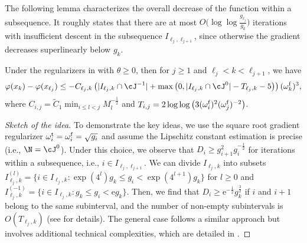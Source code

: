 The following lemma characterizes the overall decrease of the function within a subsequence.
It roughly states that there are at most $O\big (\log\log \frac{g_{\ell_j}}{g_k}\big )$ iterations with insufficient descent in the subsequence $I_{\ell_j,\ell_{j+1}}$,
since otherwise the gradient decreases superlinearly below $g_k$.

\begin{lemma}
    \label{lem:main/iteration-in-a-subsequence}
    Under the regularizers in  with $\theta \geq 0$, 
    then for $j \geq 1$ and $\ell_j  < k < \ell_{j+1}$, we have
    \begin{align}
        \varphi(x_{k})
        - \varphi(x_{\ell_{j}})
        \leq
         - C_{\ell_j,k}
        \left ( 
            |I_{\ell_j,k} \cap \cJ^{-1} |
            + 
            \max\left ( 0, | I_{\ell_j,k} \cap \cJ^0 | - T_{\ell_j,k} - 5 \right ) 
        \right ) (\omega_k^{\supfallback})^3
         ,
         \label{eqn:main/inexact-mixed-newton-inner-bound-theta0}
    \end{align}
    where $C_{i,j} = \tilde C_1 %
    \min_{i \leq l < j} M_l^{-\frac{1}{2}}$ and $T_{i,j}=2\log\log\big (3 (\omega_i^{\mathrm{f}})^2 (\omega_j^{\mathrm{f}})^{-2}\big)$.
\end{lemma}
\begin{proof}[Sketch of the idea]
To demonstrate the key ideas, we use the square root gradient regularizer  $\omega_i^{\mathrm{t}} = \omega_i^{\mathrm{f}} = \sqrt{g_i}$ 
and assume the Lipschitz constant estimation is precise (i.e., $\N = \cJ^{0}$).
Under this choice, we observe that $D_i \geq g^2_{i+1} g_i^{-\frac{1}{2}}$ for iterations within a subsequence, i.e., $i \in I_{\ell_j,\ell_{j+1}}$.
We can divide $I_{\ell_j,k}$ into subsets 
$I_{\ell_j,k}^{(l)} = \{ i \in I_{\ell_j,k} :  \exp(4^l)g_k \leq g_i < \exp(4^{l+1})g_k \}$ for $l \geq 0$ and $I_{\ell_j,k}^{(-1)} = \{ i \in I_{\ell_j,k} : g_k \leq g_i < \mathrm{e} g_k \}$. 
Then, we find that $D_i \geq \mathrm{e}^{-\frac{1}{2}}g_k^{\frac{3}{2}}$ if $i$ and $i + 1$ belong to the same subinterval, and the number of non-empty subintervals is $O(T_{\ell_j,k})$ (see  for details).
The general case follows a similar approach but involves additional technical complexities, which are detailed in .
\end{proof}

